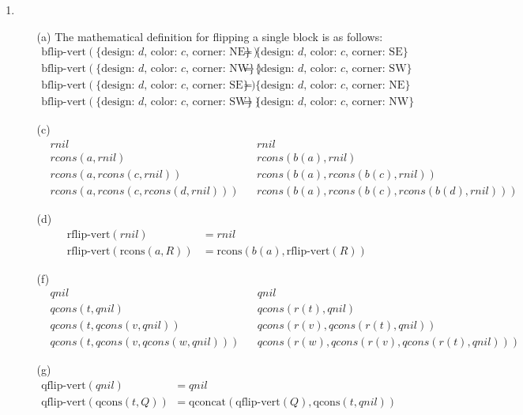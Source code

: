 \documentclass[12pt]{article}
\theoremstyle{definitionstyle}
\begin{document}
\begin{enumerate}[leftmargin=\labelsep]
        \item \begin{enumerate}
            \item[(a)] The mathematical definition for flipping a single block is as follows:
            $$\begin{aligned}
                \text{bflip-vert}(\{\text{design: $d$, color: $c$, corner: NE}\}) &= \{\text{design: $d$, color: $c$, corner: SE}\} \\
                \text{bflip-vert}(\{\text{design: $d$, color: $c$, corner: NW}\}) &= \{\text{design: $d$, color: $c$, corner: SW}\} \\
                \text{bflip-vert}(\{\text{design: $d$, color: $c$, corner: SE}\}) &= \{\text{design: $d$, color: $c$, corner: NE}\} \\
                \text{bflip-vert}(\{\text{design: $d$, color: $c$, corner: SW}\}) &= \{\text{design: $d$, color: $c$, corner: NW}\}
            \end{aligned}$$
            \item[(c)]
            \[\begin{aligned}
                &rnil && rnil \\
                &rcons(a, rnil) && rcons(b(a), rnil) \\
                &rcons(a, rcons(c, rnil)) && rcons(b(a), rcons(b(c), rnil)) \\
                &rcons(a, rcons(c, rcons(d, rnil))) && rcons(b(a), rcons(b(c), rcons(b(d), rnil)))
            \end{aligned}\]
            \item[(d)]
            \[\begin{aligned}
                \text{rflip-vert}(rnil) &= rnil \\
                \text{rflip-vert}(\text{rcons}(a, R)) &= \text{rcons}(b(a), \text{rflip-vert}(R))
            \end{aligned}\]
            \item[(f)]
            \[\begin{aligned}
                &qnil && qnil \\
                &qcons(t, qnil) && qcons(r(t), qnil) \\
                &qcons(t, qcons(v, qnil)) && qcons(r(v), qcons(r(t), qnil)) \\
                &qcons(t, qcons(v, qcons(w, qnil))) && qcons(r(w), qcons(r(v), qcons(r(t), qnil)))
            \end{aligned}\]
            \item[(g)]
            \[\begin{aligned}
                \text{qflip-vert}(qnil) &= qnil \\
                \text{qflip-vert}(\text{qcons}(t, Q)) &= \text{qconcat}(\text{qflip-vert}(Q), \text{qcons}(t, qnil)) \\
            \end{aligned}\]
        \end{enumerate}


\end{enumerate}
\end{document}
